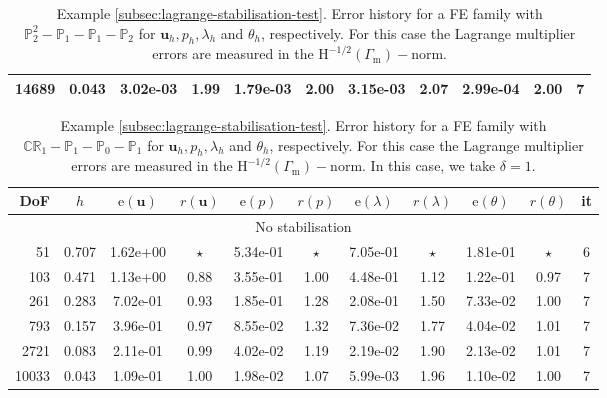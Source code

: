 \documentclass[onefignum,onetabnum,reqno,a4paper,final]{siamart250211}
\newcommand\bu{\boldsymbol{u}}
\newcommand\0{\mathbf{0}}
\renewcommand\H{\mathrm{H}}
\newcommand\Gm{\Gamma_{\mathrm{m}}}
\numberwithin{figure}{section}
\numberwithin{table}{section}
\begin{document}
{\begin{table}[t!]
{\begin{tabular}{|rcccccccccc|}
            14689 & 0.043 & 3.02e-03 & 1.99 & 1.79e-03 & 2.00 & 3.15e-03 & 2.07 & 2.99e-04 & 2.00 &  7\\
            \hline
            \hline
    \end{tabular}}
    \smallskip
    \caption{Example \ref{subsec:lagrange-stabilisation-test}. Error history for a FE family with $\mathbb{P}^2_2-\mathbb{P}_1 - \mathbb{P}_1 - \mathbb{P}_2$ 
        for $\bu_h, p_h,\lambda_h$ and $\theta_h$, respectively. For this case the Lagrange multiplier errors are measured in the $\H^{-1/2}(\Gm)-$norm. }
    \label{tables-9to12}
\end{table}

\begin{table}[t!]
\setlength{\tabcolsep}{3.5pt}
\centering 
{\small\begin{tabular}{|rcccccccccc|}
        \hline\hline
        DoF   &   $h$  & $\mathrm{e}(\bu)$  &   $r(\bu)$   &   $\mathrm{e}(p)$  &   $r(p)$  &  $\mathrm{e}(\lambda)$  &   $r(\lambda) $ &  $\mathrm{e}(\theta)$  &  $r(\theta)$  &   it \\
        \hline 
        \multicolumn{11}{|c|}{No stabilisation} \\
        \hline
       51 & 0.707 & 1.62e+00 & $\star$ & 5.34e-01 & $\star$ & 7.05e-01 & $\star$ & 1.81e-01 & $\star$ &  6\\
   103 & 0.471 & 1.13e+00 & 0.88 & 3.55e-01 & 1.00 & 4.48e-01 & 1.12 & 1.22e-01 & 0.97 &  7\\
   261 & 0.283 & 7.02e-01 & 0.93 & 1.85e-01 & 1.28 & 2.08e-01 & 1.50 & 7.33e-02 & 1.00 &  7\\
   793 & 0.157 & 3.96e-01 & 0.97 & 8.55e-02 & 1.32 & 7.36e-02 & 1.77 & 4.04e-02 & 1.01 &  7\\
  2721 & 0.083 & 2.11e-01 & 0.99 & 4.02e-02 & 1.19 & 2.19e-02 & 1.90 & 2.13e-02 & 1.01 &  7\\
 10033 & 0.043 & 1.09e-01 & 1.00 & 1.98e-02 & 1.07 & 5.99e-03 & 1.96 & 1.10e-02 & 1.00 &  7\\
        \hline
        \hline
\end{tabular}}
\smallskip
\caption{Example 
\ref{subsec:lagrange-stabilisation-test}.
Error history for a FE family with $\mathbb{CR}_1-\mathbb{P}_1 - \mathbb{P}_0 - \mathbb{P}_1$ 
    for $\bu_h, p_h,\lambda_h$ and $\theta_h$, respectively. For this case the Lagrange multiplier errors are measured in the $\H^{-1/2}(\Gm)-$norm. In this case, we take $\delta= 1$.
}
\label{table-CRstabilised}
\end{table}


}
\end{document}
